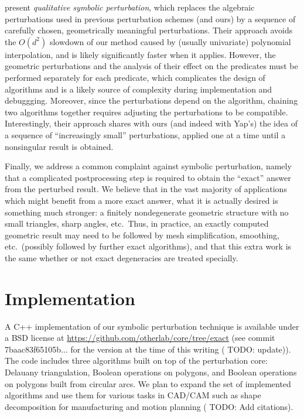 \documentclass[11pt]{article}
\newcommand{\TODO}{{\color{red} TODO}}
\begin{document}
\cite{devillers2012qualitative} present \emph{qualitative symbolic perturbation}, which replaces the algebraic perturbations used in previous perturbation schemes (and ours)
by a sequence of carefully chosen, geometrically meaningful perturbations.  Their approach avoids the $O(d^2)$ slowdown of our method caused by (usually univariate) polynomial interpolation,
and is likely significantly faster when it applies.  However, the geometric perturbations and the analysis of their effect on the predicates must be performed separately for each
predicate, which complicates the design of algorithms and is a likely source of complexity during implementation and debuggging.  Moreover, since the perturbations depend on the
algorithm, chaining two algorithms together requires adjusting the perturbations to be compatible.  Interestingly, their approach shares with ours (and indeed
with Yap's) the idea of a sequence of ``increasingly small'' perturbations, applied one at a time until a nonsingular result is obtained.

Finally, we address a common complaint against symbolic perturbation, namely that a complicated postprocessing step is required to obtain the ``exact'' answer from the
perturbed result.  We believe that in the vast majority of applications which might benefit from a more exact answer, what it is actually desired is something much
stronger: a finitely nondegenerate geometric structure with no small triangles, sharp angles, etc.\  Thus, in practice, an exactly computed geometric result may need to
be followed by mesh simplification, smoothing, etc.\ (possibly followed by further exact algorithms), and that this extra work is the same whether or not exact degeneracies are
treated specially.

\section{Implementation}

A C++ implementation of our symbolic perturbation technique is available under a BSD license at \url{https://github.com/otherlab/core/tree/exact} (see commit 7baac83f65105b$\ldots$
for the version at the time of this writing (\TODO: update)).  The code includes three algorithms built on top of the perturbation core: Delauany triangulation,
Boolean operations on polygons, and Boolean operations on polygons built from circular arcs.  We plan to expand the set of implemented algorithms and use them for various tasks
in CAD/CAM such as shape decomposition for manufacturing and motion planning (\TODO: Add citations).
\end{document}
